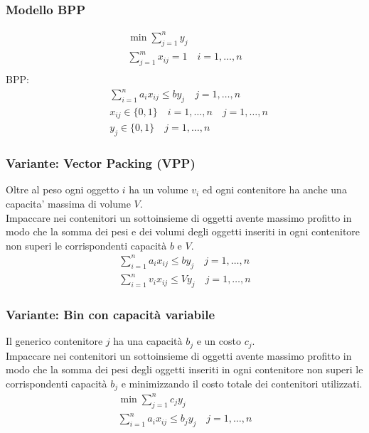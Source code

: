 \documentclass[a4paper,12pt]{article}
\begin{document}
\subsubsection*{Modello BPP}
\begin{align*}
  \min \sum_{j=1}^n y_j\\
  \sum_{j=1}^m x_{ij} = 1 \quad i=1,\dots,n\\
\end{align*}
BPP:
\begin{align*}
  & \sum_{i=1}^n a_i x_{ij} \leq b y_j \quad j=1,\dots,n\\
  & x_{ij} \in \{0,1\} \quad i=1,\dots,n \quad j=1,\dots,n\\
  & y_j \in \{0,1\} \quad j=1,\dots,n
\end{align*}
\subsubsection*{Variante: Vector Packing (VPP)}
Oltre al peso ogni oggetto $i$ ha un volume $v_i$ ed ogni contenitore ha anche una capacita' massima di volume $V$. \\
Impaccare nei contenitori un sottoinsieme di oggetti avente massimo profitto in modo che la somma dei pesi e dei volumi degli oggetti inseriti in ogni contenitore non superi le corrispondenti capacità $b$ e $V$.
\begin{align*}
  \sum_{i=1}^n a_i x_{ij} \leq b y_j \quad j=1,\dots,n\\
  \sum_{i=1}^n v_i x_{ij} \leq V y_j \quad j=1,\dots,n
\end{align*}
\subsubsection*{Variante: Bin con capacità variabile}
Il generico contenitore $j$ ha una capacità $b_j$ e un costo $c_j$. \\
Impaccare nei contenitori un sottoinsieme di oggetti avente massimo profitto in modo che la somma dei pesi degli oggetti inseriti in ogni contenitore non superi le corrispondenti capacità $b_j$ e minimizzando il costo totale dei contenitori utilizzati.
\begin{align*}
  \min \sum_{j=1}^n c_j y_j\\
  \sum_{i=1}^n a_i x_{ij} \leq b_j y_j \quad j=1,\dots,n
\end{align*}
\end{document}
